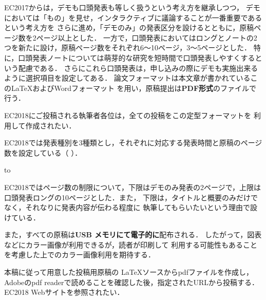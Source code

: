 EC2017からは，デモも口頭発表も等しく扱うという考え方を継承しつつ，
デモにおいては「もの」を見せ，インタラクティブに議論することが一番重要であるという考え方を
さらに進め，「デモのみ」の発表区分を設けるとともに，原稿ページ数を2ページ以上とした．
一方で，口頭発表においてはロングとノートの2つを新たに設け，原稿ページ数をそれぞれ6〜10ページ，3〜5ページとした．
特に，口頭発表ノートについては萌芽的な研究を短時間で口頭発表しやすくするという配慮である．
さらにこれら口頭発表は，申し込みの際にデモも実施出来るように選択項目を設定してある．
論文フォーマットは本文章が書かれているこのLaTeXおよびWordフォーマット
を用い，原稿提出は\textbf{PDF形式}のファイルで行う．

EC2018にご投稿される執筆者各位は，全ての投稿をこの定型フォーマットを
利用して作成されたい．

EC2018では発表種別を3種類とし，それぞれに対応する発表時間と原稿のページ数を設定している（ ）．

\begin{table}[tb]
\caption{発表種別と発表時間，原稿ページ数}
\label{tab:presentation}
\hbox to
\end{table}



EC2018ではページ数の制限について，下限はデモのみ発表の2ページで，上限は
口頭発表ロングの10ページとした．また，
下限は，タイトルと概要のみだけでなく，それなりに発表内容が伝わる程度に
執筆してもらいたいという理由で設けている．

また，すべての原稿は\textbf{USB メモリにて電子的に}配布される．
したがって，図表などにカラー画像が利用できるが，読者が印刷して
利用する可能性もあることを考慮した上でのカラー画像利用を期待する．

本稿に従って用意した投稿用原稿の \LaTeX ソースからpdfファイルを作成し，
Adobeのpdf readerで読めることを確認した後，指定されたURLから投稿する．
EC2018 Webサイトを参照されたい．




